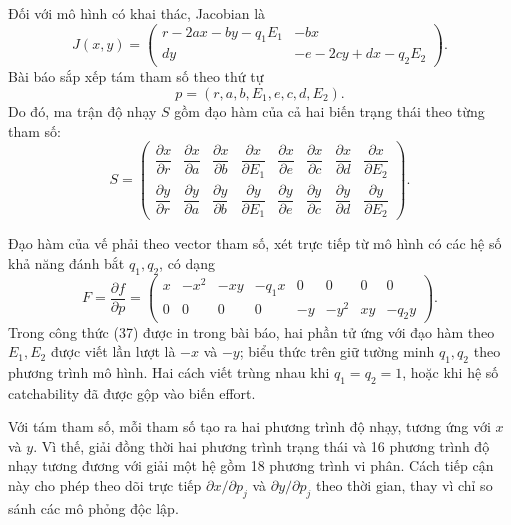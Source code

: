 Đối với mô hình có khai thác, Jacobian là
\begin{equation}
\label{eq:sens_jacobian}
J(x,y)=
\begin{pmatrix}
r-2ax-by-q_1E_1 & -bx\\
dy & -e-2cy+dx-q_2E_2
\end{pmatrix}.
\end{equation}
Bài báo sắp xếp tám tham số theo thứ tự
\[
p=(r,a,b,E_1,e,c,d,E_2).
\]
Do đó, ma trận độ nhạy \(S\) gồm đạo hàm của cả hai biến trạng thái theo từng tham số:
\begin{equation}
\label{eq:sens_matrix}
S=
\begin{pmatrix}
\dfrac{\partial x}{\partial r}&
\dfrac{\partial x}{\partial a}&
\dfrac{\partial x}{\partial b}&
\dfrac{\partial x}{\partial E_1}&
\dfrac{\partial x}{\partial e}&
\dfrac{\partial x}{\partial c}&
\dfrac{\partial x}{\partial d}&
\dfrac{\partial x}{\partial E_2}\\[0.6em]
\dfrac{\partial y}{\partial r}&
\dfrac{\partial y}{\partial a}&
\dfrac{\partial y}{\partial b}&
\dfrac{\partial y}{\partial E_1}&
\dfrac{\partial y}{\partial e}&
\dfrac{\partial y}{\partial c}&
\dfrac{\partial y}{\partial d}&
\dfrac{\partial y}{\partial E_2}
\end{pmatrix}.
\tag{36}
\end{equation}

Đạo hàm của vế phải theo vector tham số, xét trực tiếp từ mô hình có các hệ số khả năng đánh bắt \(q_1,q_2\), có dạng
\begin{equation}
\label{eq:sens_F}
F=\frac{\partial f}{\partial p}=
\begin{pmatrix}
x&-x^2&-xy&-q_1x&0&0&0&0\\
0&0&0&0&-y&-y^2&xy&-q_2y
\end{pmatrix}.
\tag{37}
\end{equation}
Trong công thức (37) được in trong bài báo, hai phần tử ứng với đạo hàm theo \(E_1,E_2\) được viết lần lượt là \(-x\) và \(-y\); biểu thức trên giữ tường minh \(q_1,q_2\) theo phương trình mô hình. Hai cách viết trùng nhau khi \(q_1=q_2=1\), hoặc khi hệ số catchability đã được gộp vào biến effort.

Với tám tham số, mỗi tham số tạo ra hai phương trình độ nhạy, tương ứng với \(x\) và \(y\). Vì thế, giải đồng thời hai phương trình trạng thái và 16 phương trình độ nhạy tương đương với giải một hệ gồm 18 phương trình vi phân. Cách tiếp cận này cho phép theo dõi trực tiếp \(\partial x/\partial p_j\) và \(\partial y/\partial p_j\) theo thời gian, thay vì chỉ so sánh các mô phỏng độc lập.

